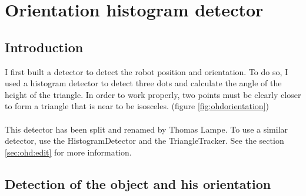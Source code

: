 \section[Orientation histogram detector (Triangle tracker)]{Orientation histogram detector}
\label{sec:ohd}

\subsection{Introduction}
\label{sec:ohd:intro}


    I first built a detector to detect the robot position and orientation. 
    To do so, I used a histogram detector to detect three dots and calculate
    the angle of the height of the triangle. In order to work properly, two 
    points must be clearly closer to form a triangle that is near to be 
    isosceles. (figure \ref{fig:ohdorientation})
\\
\\
    This detector has been split and renamed by Thomas Lampe. 
    To use a similar detector, 
    use the HistogramDetector and the 
    TriangleTracker. See the section \ref{sec:ohd:edit} for more 
    information.

\subsection{Detection of the object and his orientation}
\label{sec:ohd:detection}

